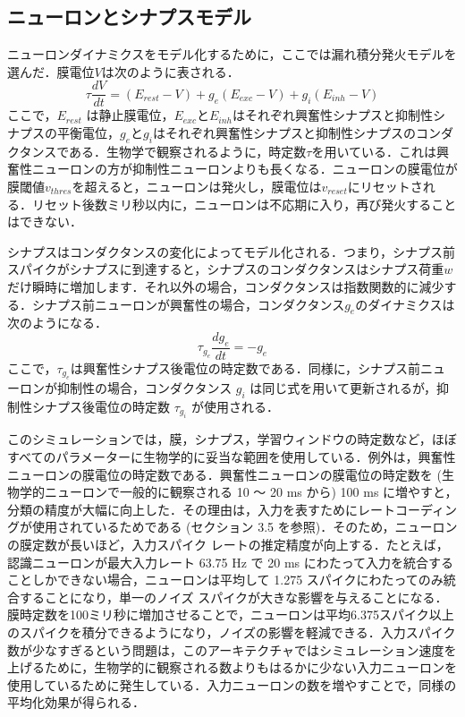 \documentclass[a4paper, titlepage]{jsarticle}
\begin{document}
\subsection{ニューロンとシナプスモデル}
ニューロンダイナミクスをモデル化するために，ここでは漏れ積分発火モデルを選んだ．膜電位$V$は次のように表される．
\begin{equation}
   \tau\frac{dV}{dt}=(E_{rest}-V)+g_e(E_{exc}-V)+g_i(E_{inh}-V)
\end{equation}
ここで，$E_{rest}$ は静止膜電位，$E_{exc}$と$E_{inh}$はそれぞれ興奮性シナプスと抑制性シナプスの平衡電位，$g_e$と$g_i$はそれぞれ興奮性シナプスと抑制性シナプスのコンダクタンスである．生物学で観察されるように，時定数$\tau$を用いている．これは興奮性ニューロンの方が抑制性ニューロンよりも長くなる．ニューロンの膜電位が膜閾値$v_{thres}$を超えると，ニューロンは発火し，膜電位は$v_{reset}$にリセットされる．リセット後数ミリ秒以内に，ニューロンは不応期に入り，再び発火することはできない．
\par
シナプスはコンダクタンスの変化によってモデル化される．つまり，シナプス前スパイクがシナプスに到達すると，シナプスのコンダクタンスはシナプス荷重$w$だけ瞬時に増加します．それ以外の場合，コンダクタンスは指数関数的に減少する．シナプス前ニューロンが興奮性の場合，コンダクタンス$g_e$のダイナミクスは次のようになる．
\begin{equation}
   \tau_{g_e}\frac{dg_e}{dt}=-g_e
\end{equation}
ここで，$\tau_{g_e}$は興奮性シナプス後電位の時定数である．同様に，シナプス前ニューロンが抑制性の場合，コンダクタンス $g_i$ は同じ式を用いて更新されるが，抑制性シナプス後電位の時定数 $τ_{g_i}$ が使用される．
\par
このシミュレーションでは，膜，シナプス，学習ウィンドウの時定数など，ほぼすべてのパラメーターに生物学的に妥当な範囲を使用している．例外は，興奮性ニューロンの膜電位の時定数である．興奮性ニューロンの膜電位の時定数を (生物学的ニューロンで一般的に観察される 10 ～ 20 ms から) 100 ms に増やすと，分類の精度が大幅に向上した．その理由は，入力を表すためにレートコーディングが使用されているためである (セクション 3.5 を参照)．そのため，ニューロンの膜定数が長いほど，入力スパイク レートの推定精度が向上する．たとえば，認識ニューロンが最大入力レート 63.75 Hz で 20 ms にわたって入力を統合することしかできない場合，ニューロンは平均して 1.275 スパイクにわたってのみ統合することになり，単一のノイズ スパイクが大きな影響を与えることになる．膜時定数を100ミリ秒に増加させることで，ニューロンは平均6.375スパイク以上のスパイクを積分できるようになり，ノイズの影響を軽減できる．入力スパイク数が少なすぎるという問題は，このアーキテクチャではシミュレーション速度を上げるために，生物学的に観察される数よりもはるかに少ない入力ニューロンを使用しているために発生している．入力ニューロンの数を増やすことで，同様の平均化効果が得られる．
\end{document}

